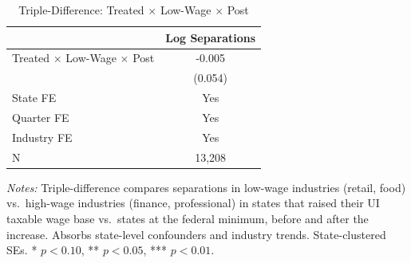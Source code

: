 \begin{table}[H]
\centering
\caption{Triple-Difference: Treated $\times$ Low-Wage $\times$ Post}
\label{tab:ddd}
\begin{threeparttable}
\begin{tabular}{lc}
\toprule
 & Log Separations \\
\midrule
Treated $\times$ Low-Wage $\times$ Post & -0.005 \\
 & (0.054) \\
\midrule
State FE & Yes \\
Quarter FE & Yes \\
Industry FE & Yes \\
N & 13,208 \\
\bottomrule
\end{tabular}
\begin{tablenotes}[flushleft]
\small
\item \textit{Notes:} Triple-difference compares separations in low-wage industries (retail, food) vs.\ high-wage industries (finance, professional) in states that raised their UI taxable wage base vs.\ states at the federal minimum, before and after the increase. Absorbs state-level confounders and industry trends. State-clustered SEs. * $p<0.10$, ** $p<0.05$, *** $p<0.01$.
\end{tablenotes}
\end{threeparttable}
\end{table}

